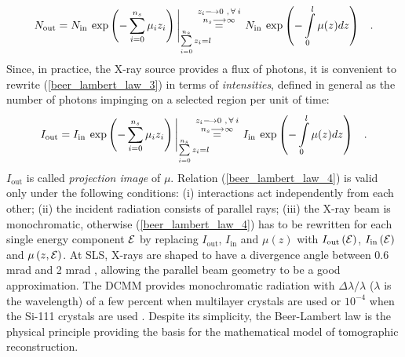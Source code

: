 {\begin{equation}
  N_{\text{out}} = N_{\text{in}}\:\exp\left( -\sum\limits_{i=0}^{n_{s}}\mu_{i}z_{i} \right)\Bigg|_{\sum\limits_{i=0}^{n_{s}}z_{i} = l}
                 \overset{\mathclap{\substack{z_{i} \longrightarrow 0\,\,,\,\forall\:i\\[2pt]n_{s} \longrightarrow \infty}}}{=}
                 \hspace{0.6cm}N_{\text{in}}\:\exp\left({-\int\limits_{0}^{l}\mu(z)dz}\right) \hspace{0.3cm}.
   \label{beer_lambert_law_3} 
\end{equation}
Since, in practice, the X-ray source provides a flux of photons, it is convenient to rewrite (\ref{beer_lambert_law_3}) in terms of 
\emph{intensities}, defined in general as the number of photons impinging on a selected region per unit of time:
\begin{equation}
  I_{\text{out}} = I_{\text{in}}\:\exp\left( -\sum\limits_{i=0}^{n_{s}}\mu_{i}z_{i} \right)\Bigg|_{\sum\limits_{i=0}^{n_{s}}z_{i} = l}
                 \overset{\mathclap{\substack{z_{i} \longrightarrow 0\,\,,\,\forall\:i\\[2pt]n_{s} \longrightarrow \infty}}}{=}
                 \hspace{0.6cm}I_{\text{in}}\:\exp\left(-\int\limits_{0}^{l}\mu(z)dz\right) \hspace{0.3cm}.
   \label{beer_lambert_law_4} 
\end{equation}
$I_{\text{out}}$ is called \emph{projection image} of $\mu$. Relation (\ref{beer_lambert_law_4}) is valid only under the following conditions:
 (i) interactions act independently from each other;
 (ii) the incident radiation consists of parallel rays;
 (iii) the X-ray beam is monochromatic, otherwise (\ref{beer_lambert_law_4}) has to be rewritten for each single energy component $\operatorname{\mathcal{E}}$
       by replacing $I_{\text{out}}$, $I_{\text{in}}$ and $\mu(z)$ with $I_{\text{out}}\left(\operatorname{\mathcal{E}}\right)$, $I_{\text{in}}\left(\operatorname{\mathcal{E}}\right)$
       and $\mu\left(z,\operatorname{\mathcal{E}}\right)$.
\newline
At SLS, X-rays are shaped to have a divergence angle between 0.6 mrad and 2 mrad \cite{SLS2016}, allowing
the parallel beam geometry to be a good approximation. The DCMM provides monochromatic radiation with $\Delta\lambda/\lambda$
($\lambda$ is the wavelength) of a few percent when multilayer crystals are used or $10^{-4}$ when the Si-111 crystals are used \cite{SLSOptics2016}.
\newline
Despite its simplicity, the Beer-Lambert law is the physical principle
providing the basis for the mathematical model of tomographic reconstruction.

}
